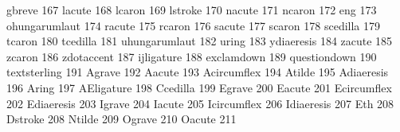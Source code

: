  gbreve          167 %
 lacute          168 %
 lcaron          169 %
 lstroke         170 %
 nacute          171 %
 ncaron          172 %
 eng             173 %
 ohungarumlaut   174 %
 racute          175 %
 rcaron          176 %
 sacute          177 %
 scaron          178 %
 scedilla        179 %
 tcaron          180 %
 tcedilla        181 %
 uhungarumlaut   182 %
 uring           183 %
 ydiaeresis      184 %
 zacute          185 %
 zcaron          186 %
 zdotaccent      187 %
 ijligature      188 %
 exclamdown      189
 questiondown    190
 textsterling    191
 Agrave          192 %
 Aacute          193 %
 Acircumflex     194 %
 Atilde          195 %
 Adiaeresis      196 %
 Aring           197 %
 AEligature      198 %
 Ccedilla        199 %
 Egrave          200 %
 Eacute          201 %
 Ecircumflex     202 %
 Ediaeresis      203 %
 Igrave          204 %
 Iacute          205 %
 Icircumflex     206 %
 Idiaeresis      207 %
 Eth             208 %
 Dstroke         208 %
 Ntilde          209 %
 Ograve          210 %
 Oacute          211 %
